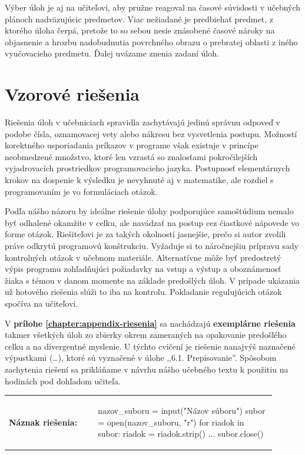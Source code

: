 Výber úloh je aj na učiteľovi, aby pružne reagoval na časové súvislosti v učebných plánoch nadväzujúcic predmetov. Viac nežiadané je predbiehať predmet, z ktorého úloha čerpá, pretože to so sebou nesie znásobené časové nároky na objasnenie a hrozbu nadobudnutia povrchného obrazu o prebratej oblasti z iného vyučovacieho predmetu. Ďalej uvázame znenia zadaní úloh.









\section{Vzorové riešenia}
Riešenia úloh v učebniciach spravidla zachytávajú jedinú správnu odpoveď v podobe čísla, oznamovacej vety alebo nákresu bez vysvetlenia postupu. Možností korektného usporiadania príkazov v programe však existuje v princípe neobmedzené množstvo, ktoré len vzrastá so znalosťami pokročilejších vyjadrovacích prostriedkov programovacieho jazyka. Postupnosť elementárnych krokov na dospenie k výsledku je nevyhnuté aj v matematike, ale rozdiel s programovaním je vo formuláciach otázok. 

Podľa nášho názoru by ideálne riešenie úlohy podporujúce samoštúdium nemalo byť odhalené okamžite v celku, ale navádzať na postup cez čiastkové nápovede vo forme otázok. Riešiteľovi je za takých okolností jasnejšie, prečo si autor zvolili práve odkrytú programovú konštrukciu. Vyžaduje si to náročnejšiu prípravu sady kontrolných otázok v učebnom materiále. Alternatívne môže byť predostretý výpis programu zohľadňujúci požiadavky na vstup a výstup a oboznámenosť žiaka s témou v danom momente na základe predošlých úloh. V prípade ukázania už hotového riešenia slúži to iba na kontrolu. Pokladanie regulujúcich otázok spočíva na učiteľovi. 

V \textbf{prílohe \ref{chapter:appendix-riesenia}} sa nachádzajú \textbf{exemplárne riešenia} takmer všetkých úloh zo zbierky okrem zameraných na opakovanie predošlého celku a na divergentné myslenie. U týchto cvičení je riešenie nanajvýš naznačené výpustkami (\dots), ktoré sú vyznačené v úlohe ,,6.1. Prepisovanie''. Spôsobom zachytenia riešení sa prikláňame v návrhu nášho učebného textu k použitiu na hodinách pod dohľadom učiteľa. 

\begin{tabular}{@{}p{0.3\linewidth}p{0.6\linewidth}}
\textbf{\small Náznak riešenia:} &
\vspace{-1em}
\begin{solution}
nazov_suboru = input("Názov súboru")
subor = open(nazov_suboru, "r")
for riadok in subor:
    riadok = riadok.strip()
    ...
subor.close()
\end{solution}
\end{tabular}

